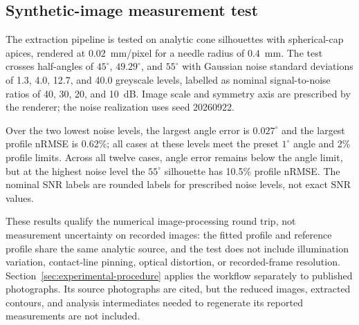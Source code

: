 \subsection{Synthetic-image measurement test}\label{sec:synthetic-completed}
The extraction pipeline is tested on analytic cone silhouettes with spherical-cap apices, rendered at $0.02$~mm/pixel for a needle radius of $0.4$~mm. The test crosses half-angles of $45^\circ$, $49.29^\circ$, and $55^\circ$ with Gaussian noise standard deviations of 1.3, 4.0, 12.7, and 40.0 greyscale levels, labelled as nominal signal-to-noise ratios of 40, 30, 20, and 10~dB. Image scale and symmetry axis are prescribed by the renderer; the noise realization uses seed 20260922.

Over the two lowest noise levels, the largest angle error is $0.027^\circ$ and the largest profile nRMSE is 0.62\%; all cases at these levels meet the preset $1^\circ$ angle and 2\% profile limits. Across all twelve cases, angle error remains below the angle limit, but at the highest noise level the $55^\circ$ silhouette has 10.5\% profile nRMSE. The nominal SNR labels are rounded labels for prescribed noise levels, not exact SNR values.

These results qualify the numerical image-processing round trip, not measurement uncertainty on recorded images: the fitted profile and reference profile share the same analytic source, and the test does not include illumination variation, contact-line pinning, optical distortion, or recorded-frame resolution. Section~\ref{sec:experimental-procedure} applies the workflow separately to published photographs. Its source photographs are cited, but the reduced images, extracted contours, and analysis intermediates needed to regenerate its reported measurements are not included.
